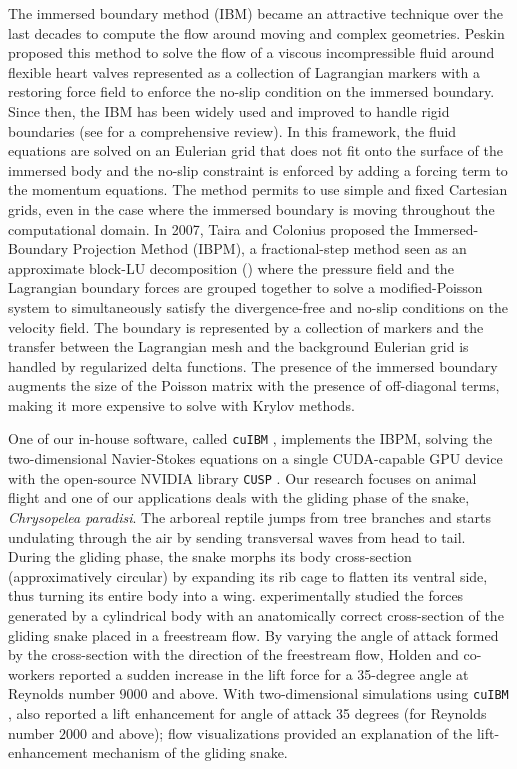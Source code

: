 \documentclass[10pt]{article}
\newcommand{\cuibm}{\texttt{cuIBM} }
\newcommand{\cusp}{\texttt{CUSP} }
\begin{document}
The immersed boundary method (IBM) became an attractive technique over the last decades to compute the flow around moving and complex geometries.
Peskin\cite{Peskin_1972} proposed this method to solve the flow of a viscous incompressible fluid around flexible heart valves represented as a collection of Lagrangian markers with a restoring force field to enforce the no-slip condition on the immersed boundary.
Since then, the IBM has been widely used and improved to handle rigid boundaries (see \cite{Mittal_Iaccarino_2005} for a comprehensive review).
In this framework, the fluid equations are solved on an Eulerian grid that does not fit onto the surface of the immersed body and the no-slip constraint is enforced by adding a forcing term to the momentum equations.
The method permits to use simple and fixed Cartesian grids, even in the case where the immersed boundary is moving throughout the computational domain.
In 2007, Taira and Colonius\cite{Taira_Colonius_2007} proposed the Immersed-Boundary Projection Method (IBPM), a fractional-step method seen as an approximate block-LU decomposition (\cite{Perot_1993}) where the pressure field and the Lagrangian boundary forces are grouped together to solve a modified-Poisson system to simultaneously satisfy the divergence-free and no-slip conditions on the velocity field.
The boundary is represented by a collection of markers and the transfer between the Lagrangian mesh and the background Eulerian grid is handled by regularized delta functions.
The presence of the immersed boundary augments the size of the Poisson matrix with the presence of off-diagonal terms, making it more expensive to solve with Krylov methods.

One of our in-house software, called \cuibm\cite{Krishnan_et_al_2017}, implements the IBPM, solving the two-dimensional Navier-Stokes equations on a single CUDA-capable GPU device with the open-source NVIDIA library \cusp\cite{Cusp}.
Our research focuses on animal flight and one of our applications deals with the gliding phase of the snake, \textit{Chrysopelea paradisi}\cite{Socha_2011}.
The arboreal reptile jumps from tree branches and starts undulating through the air by sending transversal waves from head to tail.
During the gliding phase, the snake morphs its body cross-section (approximatively circular) by expanding its rib cage to flatten its ventral side, thus turning its entire body into a wing.
\cite{Holden_et_al_2014} experimentally studied the forces generated by a cylindrical body with an anatomically correct cross-section of the gliding snake placed in a freestream flow.
By varying the angle of attack formed by the cross-section with the direction of the freestream flow, Holden and co-workers reported a sudden increase in the lift force for a 35-degree angle at Reynolds number $9000$ and above.
With two-dimensional simulations using \cuibm, \cite{Krishnan_et_al_2014} also reported a lift enhancement for angle of attack 35 degrees (for Reynolds number $2000$ and above); flow visualizations provided an explanation of the lift-enhancement mechanism of the gliding snake.
\end{document}

